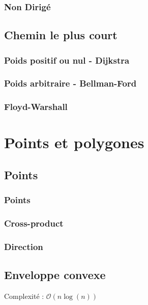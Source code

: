 \documentclass[8pt]{article}
\begin{document}
            \subsubsection{Non Dirigé}
            {\scriptsize}
        \subsection{Chemin le plus court}
            \subsubsection{Poids positif ou nul - Dijkstra}
            {\scriptsize}
            \subsubsection{Poids arbitraire - Bellman-Ford}
            {\scriptsize}
            \subsubsection{Floyd-Warshall}
            {\scriptsize}
    \section{Points et polygones}
        \subsection{Points}
            \subsubsection{Points}
            {\scriptsize}
            \subsubsection{Cross-product}
            {\scriptsize}
            \subsubsection{Direction}
            {\scriptsize}
        \subsection{Enveloppe convexe}
            Complexité : $\mathcal{O}(n \log(n))$
            {\scriptsize}
\end{document}
